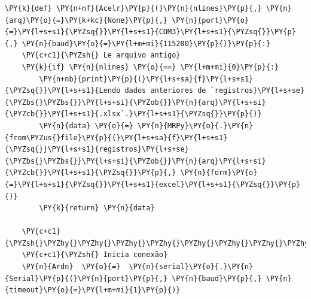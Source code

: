     \begin{tcolorbox}[breakable, size=fbox, boxrule=1pt, pad at break*=1mm,colback=cellbackground, colframe=cellborder]
\begin{Verbatim}[commandchars=\\\{\}]
\PY{k}{def} \PY{n+nf}{Acelr}\PY{p}{(}\PY{n}{nlines}\PY{p}{,} \PY{n}{arq}\PY{o}{=}\PY{k+kc}{None}\PY{p}{,} \PY{n}{port}\PY{o}{=}\PY{l+s+s1}{\PYZsq{}}\PY{l+s+s1}{COM3}\PY{l+s+s1}{\PYZsq{}}\PY{p}{,} \PY{n}{baud}\PY{o}{=}\PY{l+m+mi}{115200}\PY{p}{)}\PY{p}{:}
    \PY{c+c1}{\PYZsh{} Le arquivo antigo}
    \PY{k}{if} \PY{n}{nlines} \PY{o}{==} \PY{l+m+mi}{0}\PY{p}{:}
        \PY{n+nb}{print}\PY{p}{(}\PY{l+s+sa}{f}\PY{l+s+s1}{\PYZsq{}}\PY{l+s+s1}{Lendo dados anteriores de `registros}\PY{l+s+se}{\PYZbs{}\PYZbs{}}\PY{l+s+si}{\PYZob{}}\PY{n}{arq}\PY{l+s+si}{\PYZcb{}}\PY{l+s+s1}{.xlsx`.}\PY{l+s+s1}{\PYZsq{}}\PY{p}{)}
        \PY{n}{data} \PY{o}{=} \PY{n}{MRPy}\PY{o}{.}\PY{n}{from\PYZus{}file}\PY{p}{(}\PY{l+s+sa}{f}\PY{l+s+s1}{\PYZsq{}}\PY{l+s+s1}{registros}\PY{l+s+se}{\PYZbs{}\PYZbs{}}\PY{l+s+si}{\PYZob{}}\PY{n}{arq}\PY{l+s+si}{\PYZcb{}}\PY{l+s+s1}{\PYZsq{}}\PY{p}{,} \PY{n}{form}\PY{o}{=}\PY{l+s+s1}{\PYZsq{}}\PY{l+s+s1}{excel}\PY{l+s+s1}{\PYZsq{}}\PY{p}{)}
        \PY{k}{return} \PY{n}{data}
    
    \PY{c+c1}{\PYZsh{}\PYZhy{}\PYZhy{}\PYZhy{}\PYZhy{}\PYZhy{}\PYZhy{}\PYZhy{}\PYZhy{}\PYZhy{}\PYZhy{}\PYZhy{}\PYZhy{}\PYZhy{}\PYZhy{}}
    \PY{c+c1}{\PYZsh{} Inicia conexão}
    \PY{n}{Ardn}  \PY{o}{=}  \PY{n}{serial}\PY{o}{.}\PY{n}{Serial}\PY{p}{(}\PY{n}{port}\PY{p}{,} \PY{n}{baud}\PY{p}{,} \PY{n}{timeout}\PY{o}{=}\PY{l+m+mi}{1}\PY{p}{)}


\end{Verbatim}
\end{tcolorbox}
